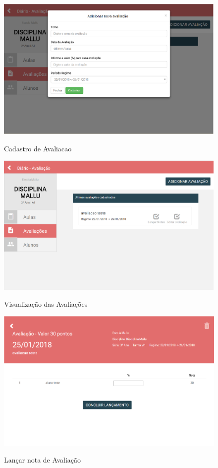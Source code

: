 \begin{figure}[!htb]
	\centering
	\caption{Cadastro de Avaliacao} %
	\includegraphics[scale=0.4]{cadastrarAvaliacao}\\ 
	{\small } %
	\label{fig:cadastrarAvaliacao} %
\end{figure}

\begin{figure}[!htb]
	\centering
	\caption{Visualização das Avaliações } %
	\includegraphics[scale=0.4]{visualizaAvaliacoes}\\  %
	{\small } %
	\label{visualizaAvaliacoes} %
\end{figure}

\begin{figure}[!htb]
	\centering
	\caption{Lançar nota de Avaliação } %
	\includegraphics[scale=0.4]{notas}\\  %
	{\small } %
	\label{notas} %
\end{figure}
